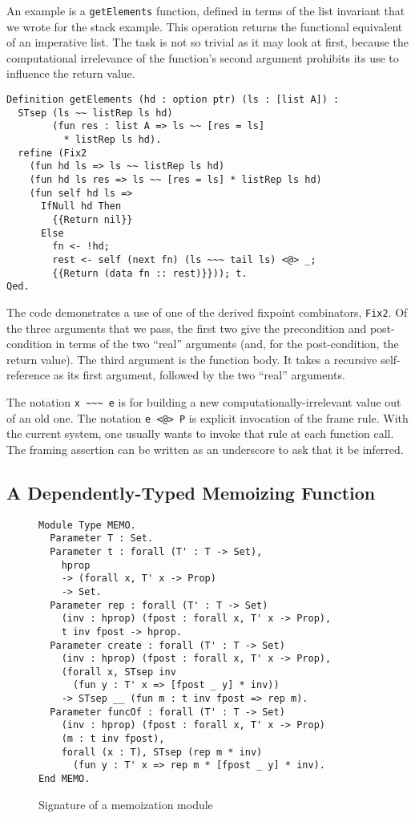 \documentclass[preprint,nocopyrightspace]{sigplanconf}
\newcommand{\cd}[1]{\texttt{#1}}
\begin{document}
An example is a \cd{getElements} function, defined in terms of the list invariant that we wrote for the stack example.  This operation returns the functional equivalent of an imperative list.  The task is not so trivial as it may look at first, because the computational irrelevance of the function's second argument prohibits its use to influence the return value.

\begin{verbatim}
Definition getElements (hd : option ptr) (ls : [list A]) :
  STsep (ls ~~ listRep ls hd)
        (fun res : list A => ls ~~ [res = ls]
          * listRep ls hd).
  refine (Fix2
    (fun hd ls => ls ~~ listRep ls hd)
    (fun hd ls res => ls ~~ [res = ls] * listRep ls hd)
    (fun self hd ls => 
      IfNull hd Then
        {{Return nil}}
      Else
        fn <- !hd;
        rest <- self (next fn) (ls ~~~ tail ls) <@> _;
        {{Return (data fn :: rest)}})); t.
Qed.
\end{verbatim}

The code demonstrates a use of one of the derived fixpoint combinators, \cd{Fix2}.  Of the three arguments that we pass, the first two give the precondition and post-condition in terms of the two ``real'' arguments (and, for the post-condition, the return value).  The third argument is the function body.  It takes a recursive self-reference as its first argument, followed by the two ``real'' arguments.

The notation \cd{x \textasciitilde\textasciitilde\textasciitilde \; e} is for building a new computationally-irrelevant value out of an old one.  The notation \cd{e <@> P} is explicit invocation of the frame rule.  With the current system, one usually wants to invoke that rule at each function call.  The framing assertion can be written as an underscore to ask that it be inferred.



\subsection{A Dependently-Typed Memoizing Function}

\begin{figure}
  \begin{verbatim}
Module Type MEMO.
  Parameter T : Set.
  Parameter t : forall (T' : T -> Set),
    hprop
    -> (forall x, T' x -> Prop)
    -> Set.
  Parameter rep : forall (T' : T -> Set)
    (inv : hprop) (fpost : forall x, T' x -> Prop),
    t inv fpost -> hprop.
  Parameter create : forall (T' : T -> Set)
    (inv : hprop) (fpost : forall x, T' x -> Prop),
    (forall x, STsep inv
      (fun y : T' x => [fpost _ y] * inv))
    -> STsep __ (fun m : t inv fpost => rep m).
  Parameter funcOf : forall (T' : T -> Set)
    (inv : hprop) (fpost : forall x, T' x -> Prop)
    (m : t inv fpost),
    forall (x : T), STsep (rep m * inv)
      (fun y : T' x => rep m * [fpost _ y] * inv).
End MEMO.
  \end{verbatim}
  \caption{\label{memoize}Signature of a memoization module}
\end{figure}
\end{document}
